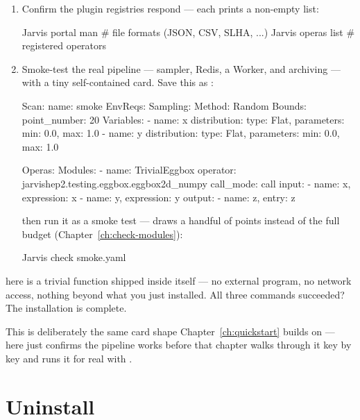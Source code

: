 \begin{enumerate}
  \item Confirm the plugin registries respond --- each prints a non-empty list:
\begin{terminal}
\begin{jcmd}
Jarvis portal man     # file formats (JSON, CSV, SLHA, ...)
Jarvis operas list    # registered operators
\end{jcmd}
\end{terminal}
  \item Smoke-test the real pipeline --- sampler, Redis, a Worker, and archiving ---
        with a tiny self-contained card. Save this as :
\begin{yamlwin}
Scan:
  name: smoke
EnvReqs: {}
Sampling:
  Method: Random
  Bounds:
    point_number: 20
  Variables:
    - name: x
      distribution: {type: Flat, parameters: {min: 0.0, max: 1.0}}
    - name: y
      distribution: {type: Flat, parameters: {min: 0.0, max: 1.0}}

Operas:
  Modules:
    - name: TrivialEggbox
      operator: jarvishep2.testing.eggbox.eggbox2d_numpy
      call_mode: call
      input:
        - {name: x, expression: x}
        - {name: y, expression: y}
      output:
        - {name: z, entry: z}
\end{yamlwin}
        then run it as a smoke test ---  draws a handful of points instead
        of the full budget (Chapter~\ref{ch:check-modules}):
\begin{terminal}
\begin{jcmd}
Jarvis check smoke.yaml
\end{jcmd}
\end{terminal}
\end{enumerate}

 here is a trivial function shipped inside
 itself --- no external program, no network access, nothing beyond
what you just installed. All three commands succeeded? The installation is complete.

\begin{jnote}
This is deliberately the same card shape Chapter~\ref{ch:quickstart} builds on ---
 here just confirms the pipeline works before that chapter walks through it
key by key and runs it for real with .
\end{jnote}

\section{Uninstall}
\label{sec:uninstall}

